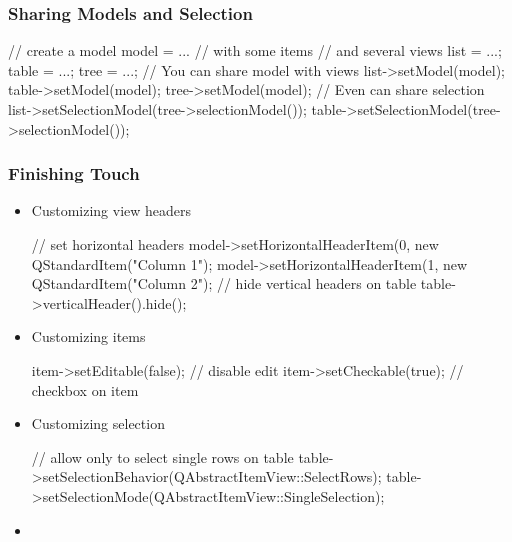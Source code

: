 \begin{slide}[fragile]{}\frametitle{Sharing Models and Selection}
  \begin{cpp}// create a model
model = ... // with some items
// and several views
list = ...; table = ...; tree = ...;
// You can share model with views
list->setModel(model);
table->setModel(model);
tree->setModel(model);
// Even can share selection
list->setSelectionModel(tree->selectionModel());
table->setSelectionModel(tree->selectionModel());
\end{cpp}
\end{slide}

\begin{slide}[fragile]{}\frametitle{Finishing Touch}
\begin{itemize}
  \item Customizing view headers
  \begin{cpp}// set horizontal headers
model->setHorizontalHeaderItem(0, new QStandardItem("Column 1");
model->setHorizontalHeaderItem(1, new QStandardItem("Column 2");
// hide vertical headers on table
table->verticalHeader().hide();
\end{cpp}

  \item Customizing items
  \begin{cpp}item->setEditable(false); // disable edit
item->setCheckable(true); // checkbox on item
\end{cpp}

  \item Customizing selection
  \begin{cpp}// allow only to select single rows on table
table->setSelectionBehavior(QAbstractItemView::SelectRows);
table->setSelectionMode(QAbstractItemView::SingleSelection);
\end{cpp}

  \item {}
\end{itemize}
\end{slide}

